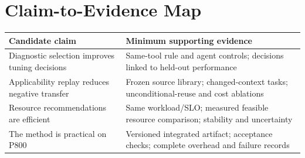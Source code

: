 \documentclass[11pt,a4paper]{article}
\begin{document}
\section{Claim-to-Evidence Map}
\begin{tabularx}{\linewidth}{@{}YY@{}}
\toprule
Candidate claim & Minimum supporting evidence \\
\midrule
Diagnostic selection improves tuning decisions & Same-tool rule and agent controls; decisions linked to held-out performance \\
Applicability replay reduces negative transfer & Frozen source library; changed-context tasks; unconditional-reuse and cost ablations \\
Resource recommendations are efficient & Same workload/SLO; measured feasible resource comparison; stability and uncertainty \\
The method is practical on P800 & Versioned integrated artifact; acceptance checks; complete overhead and failure records \\
\bottomrule
\end{tabularx}

{\small
\setlength{\bibsep}{5pt plus 1pt minus 1pt}


}
\end{document}
